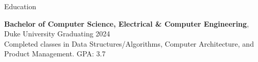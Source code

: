 \documentclass{resume}
\begin{document}






\begin{rSection}{Education}

\textbf{Bachelor of Computer Science, Electrical \& Computer Engineering}, Duke University \hfill {Graduating 2024}\\
Completed classes in Data Structures/Algorithms, Computer Architecture, and Product Management. \hfill {GPA: 3.7}


\end{rSection}

\end{document}
